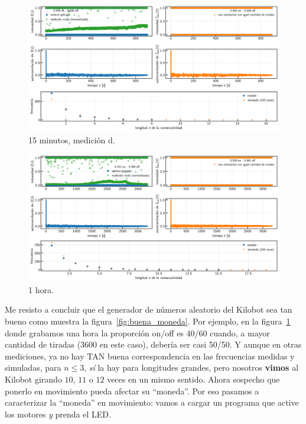 \documentclass[a4paper]{article}
\begin{document}
\begin{figure}[!h]
	\centering
	\includegraphics[width=\linewidth]{Resultados/15min_d.png}
	\caption{15 minutos, medición d.}
\end{figure}

\begin{figure}[!h]
	\centering
	\includegraphics[width=\linewidth]{Resultados/1h.png}
	\caption{1 hora.}
	\label{fig:1hora}
\end{figure}

Me resisto a concluir que el generador de números aleatorio del Kilobot sea tan bueno como muestra la figura~\ref{fig:buena_moneda}.
Por ejemplo, en la figura~\ref{fig:1hora} donde grabamos una hora la proporción on/off es 40/60 cuando, a mayor cantidad de tiradas ($3600$ en este caso), debería ser casi 50/50.
Y aunque en otras mediciones, ya no hay TAN buena correspondencia en las frecuencias medidas y simuladas, para $n \leq 3$, \emph{sí} la hay para longitudes grandes, pero nosotros \textbf{vimos} al Kilobot girando $10$, $11$ o $12$ veces en un mismo sentido.
Ahora sospecho que ponerlo en movimiento pueda afectar su ``moneda''.
Por eso pasamos a caracterizar la ``moneda'' en movimiento: vamos a cargar un programa que active los motores \emph{y} prenda el LED.
\end{document}

